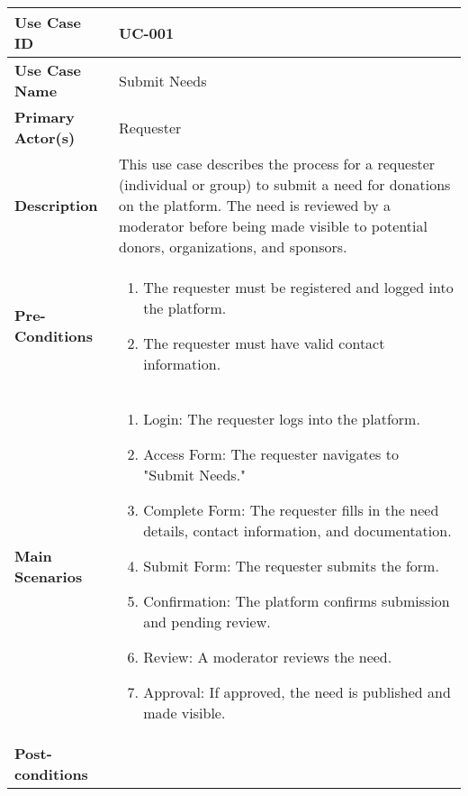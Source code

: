 \begin{table}[!ht]
    \centering
    \begin{tabularx}{\textwidth}{|l|X|}
        \hline
        \textbf{Use Case ID} & UC-001 \\
        \hline
        \textbf{Use Case Name} & Submit Needs \\
        \hline
        \textbf{Primary Actor(s)} & Requester \\
        \hline
        \textbf{Description} & This use case describes the process for a requester (individual or group) to submit a need for donations on the platform. The need is reviewed by a moderator before being made visible to potential donors, organizations, and sponsors. \\
        \hline
        \textbf{Pre-Conditions} & 
                \begin{enumerate}[label=\arabic*.,itemsep=0pt]
            \item The requester must be registered and logged into the platform.
            \item The requester must have valid contact information.
        \end{enumerate} \\
        \hline
        \textbf{Main Scenarios} & 
        \begin{enumerate}[label=\arabic*.,itemsep=0pt]
            \item Login: The requester logs into the platform.
            \item Access Form: The requester navigates to "Submit Needs."
            \item Complete Form: The requester fills in the need details, contact information, and documentation.
            \item Submit Form: The requester submits the form.
            \item Confirmation: The platform confirms submission and pending review.
            \item Review: A moderator reviews the need.
            \item Approval: If approved, the need is published and made visible.
        \end{enumerate} \\
        \hline
        \textbf{Post-conditions} & 
        \begin{itemize}[label=--,itemsep=0pt]

\end{itemize}
\end{tabularx}
\end{table}
